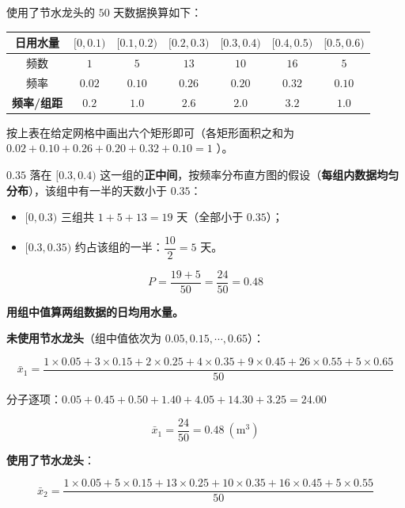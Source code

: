 \begin{answer}
使用了节水龙头的 $50$ 天数据换算如下：

\begin{center}
\begin{tabular}{ccccccc}
\toprule
日用水量 & $[0,0.1)$ & $[0.1,0.2)$ & $[0.2,0.3)$ & $[0.3,0.4)$ & $[0.4,0.5)$ & $[0.5,0.6)$ \\
\midrule
频数 & $1$ & $5$ & $13$ & $10$ & $16$ & $5$ \\
频率 & $0.02$ & $0.10$ & $0.26$ & $0.20$ & $0.32$ & $0.10$ \\
\textbf{频率/组距} & $\mathbf{0.2}$ & $\mathbf{1.0}$ & $\mathbf{2.6}$ & $\mathbf{2.0}$ & $\mathbf{3.2}$ & $\mathbf{1.0}$ \\
\bottomrule
\end{tabular}
\end{center}

按上表在给定网格中画出六个矩形即可（各矩形面积之和为 $0.02+0.10+0.26+0.20+0.32+0.10=1$ ）。


$0.35$ 落在 $[0.3,0.4)$ 这一组的\textbf{正中间}，按频率分布直方图的假设（\textbf{每组内数据均匀分布}），该组中有一半的天数小于 $0.35$：

\begin{itemize}
\item $[0,0.3)$ 三组共 $1+5+13=19$ 天（全部小于 $0.35$）；
\item $[0.3,0.35)$ 约占该组的一半：$\dfrac{10}2=5$ 天。
\end{itemize}

\nopagebreak[4]
\[P=\frac{19+5}{50}=\frac{24}{50}=0.48\]


\textbf{用组中值算两组数据的日均用水量。}

\textbf{未使用节水龙头}（组中值依次为 $0.05,0.15,\cdots,0.65$）：

\nopagebreak[4]
\[\bar x_1=\frac{1\times0.05+3\times0.15+2\times0.25+4\times0.35+9\times0.45+26\times0.55+5\times0.65}{50}\]

分子逐项：$0.05+0.45+0.50+1.40+4.05+14.30+3.25=24.00$

\nopagebreak[4]
\[\bar x_1=\frac{24}{50}=0.48\ \left(\mathrm m^{3}\right)\]

\textbf{使用了节水龙头}：

\nopagebreak[4]
\[\bar x_2=\frac{1\times0.05+5\times0.15+13\times0.25+10\times0.35+16\times0.45+5\times0.55}{50}\]


\end{answer}
